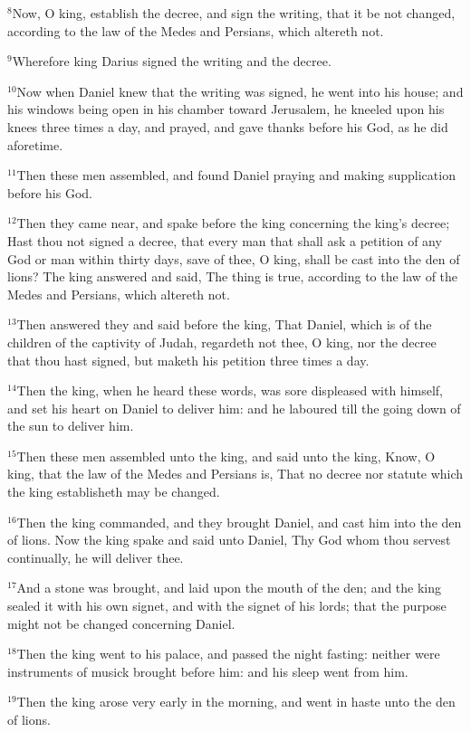 \documentclass[12pt]{article}
\begin{document}
$^{8}$Now, O king, establish the decree, and sign the writing, that it
be not changed, according to the law of the Medes and Persians, which
altereth not.


$^{9}$Wherefore king Darius signed the writing and the decree.

$^{10}$Now when Daniel knew that the writing was signed, he went into
his house; and his windows being open in his chamber toward Jerusalem,
he kneeled upon his knees three times a day, and prayed, and gave
thanks before his God, as he did aforetime.


$^{11}$Then these men assembled, and found Daniel praying and making
supplication before his God.


$^{12}$Then they came near, and spake before the king concerning the
king's decree; Hast thou not signed a decree, that every man that
shall ask a petition of any God or man within thirty days, save of
thee, O king, shall be cast into the den of lions? The king answered
and said, The thing is true, according to the law of the Medes and
Persians, which altereth not.


$^{13}$Then answered they and said before the king, That Daniel, which
is of the children of the captivity of Judah, regardeth not thee, O
king, nor the decree that thou hast signed, but maketh his petition
three times a day.


$^{14}$Then the king, when he heard these words, was sore displeased
with himself, and set his heart on Daniel to deliver him: and he
laboured till the going down of the sun to deliver him.


$^{15}$Then these men assembled unto the king, and said unto the king,
Know, O king, that the law of the Medes and Persians is, That no
decree nor statute which the king establisheth may be changed.


$^{16}$Then the king commanded, and they brought Daniel, and cast him
into the den of lions. Now the king spake and said unto Daniel, Thy
God whom thou servest continually, he will deliver thee.


$^{17}$And a stone was brought, and laid upon the mouth of the den; and
the king sealed it with his own signet, and with the signet of his
lords; that the purpose might not be changed concerning Daniel.


$^{18}$Then the king went to his palace, and passed the night fasting:
neither were instruments of musick brought before him: and his sleep
went from him.


$^{19}$Then the king arose very early in the morning, and went in haste
unto the den of lions.
\end{document}
